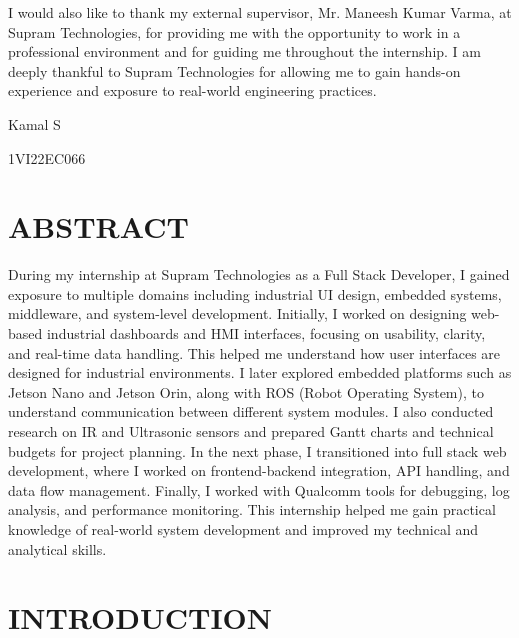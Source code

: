 \documentclass[12pt,a4paper]{report}
\begin{document}
I would also like to thank my external supervisor, Mr. Maneesh Kumar Varma, at Supram Technologies, for providing me with the opportunity to work in a professional environment and for guiding me throughout the internship. I am deeply thankful to Supram Technologies for allowing me to gain hands-on experience and exposure to real-world engineering practices.

\vspace{0.5cm}
Kamal S\par
1VI22EC066\par

\newpage
\chapter*{ABSTRACT}

During my internship at Supram Technologies as a Full Stack Developer, I gained exposure to multiple domains including industrial UI design, embedded systems, middleware, and system-level development. Initially, I worked on designing web-based industrial dashboards and HMI interfaces, focusing on usability, clarity, and real-time data handling. This helped me understand how user interfaces are designed for industrial environments. I later explored embedded platforms such as Jetson Nano and Jetson Orin, along with ROS (Robot Operating System), to understand communication between different system modules. I also conducted research on IR and Ultrasonic sensors and prepared Gantt charts and technical budgets for project planning. In the next phase, I transitioned into full stack web development, where I worked on frontend-backend integration, API handling, and data flow management. Finally, I worked with Qualcomm tools for debugging, log analysis, and performance monitoring. This internship helped me gain practical knowledge of real-world system development and improved my technical and analytical skills.

\newpage
\tableofcontents
{}

\newpage
\listoffigures
{}

\chapter{INTRODUCTION}
\end{document}
